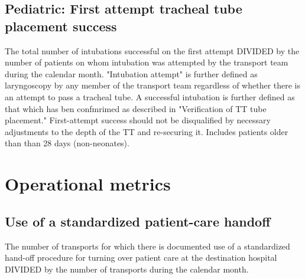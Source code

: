 \documentclass[twoside]{article}\usepackage[]{graphicx}\usepackage[]{color}
\makeatletter
\newenvironment{kframe}{%
 \def\at@end@of@kframe{}%
 \ifinner\ifhmode%
  \def\at@end@of@kframe{\end{minipage}}%
  \begin{minipage}{\columnwidth}%
 \fi\fi%
 \def\FrameCommand##1{\hskip\@totalleftmargin \hskip-\fboxsep
 \colorbox{shadecolor}{##1}\hskip-\fboxsep
     \hskip-\linewidth \hskip-\@totalleftmargin \hskip\columnwidth}%
 \MakeFramed {\advance\hsize-\width
   \@totalleftmargin\z@ \linewidth\hsize
   \@setminipage}}%
 {\par\unskip\endMakeFramed%
 \at@end@of@kframe}
\newenvironment{knitrout}{}{} %
\makeatother
\begin{document}
\newpage
\subsection{Pediatric: First attempt tracheal tube placement success}
The total number of intubations successful on the first attempt DIVIDED by the number of patients on whom intubation was attempted by the transport team during the calendar month. "Intubation attempt" is further defined as laryngoscopy by any member of the transport team regardless of whether there is an attempt to pass a tracheal tube. A successful intubation is further defined as that which has ben confmrimed as described in "Verification of TT tube placement." First-attempt success should not be disqualified by necessary adjustments to the depth of the TT and re-securing it. Includes patients older than than 28 days (non-neonates).

\begin{center}
\begin{knitrout}
\color{fgcolor}\begin{kframe}


{\ttfamily\noindent\bfseries\color{errorcolor}{\#\# Error: only defined on a data frame with all numeric variables}}\end{kframe}
\end{knitrout}
\end{center}

\begin{kframe}


{\ttfamily\noindent\bfseries{}}\end{kframe}




\newpage
\section{Operational metrics}
\subsection{Use of a standardized patient-care handoff}
The number of transports for which there is documented use of a standardized hand-off procedure for turning over patient care at the destination hospital DIVIDED by the number of transports during the calendar month.

\begin{center}
\begin{knitrout}
\color{fgcolor}\begin{kframe}


{\ttfamily\noindent\bfseries\color{errorcolor}{\#\# Error: elements of 'x' must not be greater than those of 'n'}}\end{kframe}
\end{knitrout}
\end{center}
\end{document}
